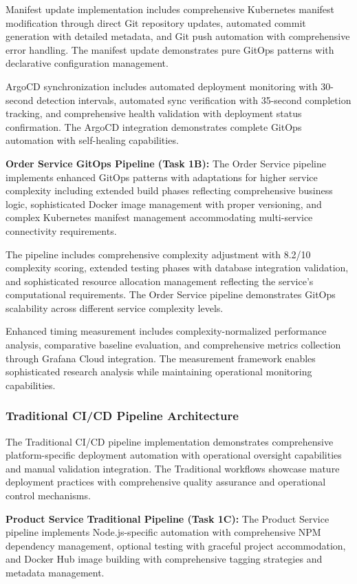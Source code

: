 Manifest update implementation includes comprehensive Kubernetes manifest modification through direct Git repository updates, automated commit generation with detailed metadata, and Git push automation with comprehensive error handling. The manifest update demonstrates pure GitOps patterns with declarative configuration management.

ArgoCD synchronization includes automated deployment monitoring with 30-second detection intervals, automated sync verification with 35-second completion tracking, and comprehensive health validation with deployment status confirmation. The ArgoCD integration demonstrates complete GitOps automation with self-healing capabilities.

\textbf{Order Service GitOps Pipeline (Task 1B):}
The Order Service pipeline implements enhanced GitOps patterns with adaptations for higher service complexity including extended build phases reflecting comprehensive business logic, sophisticated Docker image management with proper versioning, and complex Kubernetes manifest management accommodating multi-service connectivity requirements.

The pipeline includes comprehensive complexity adjustment with 8.2/10 complexity scoring, extended testing phases with database integration validation, and sophisticated resource allocation management reflecting the service's computational requirements. The Order Service pipeline demonstrates GitOps scalability across different service complexity levels.

Enhanced timing measurement includes complexity-normalized performance analysis, comparative baseline evaluation, and comprehensive metrics collection through Grafana Cloud integration. The measurement framework enables sophisticated research analysis while maintaining operational monitoring capabilities.

\subsubsection{Traditional CI/CD Pipeline Architecture}

The Traditional CI/CD pipeline implementation demonstrates comprehensive platform-specific deployment automation with operational oversight capabilities and manual validation integration. The Traditional workflows showcase mature deployment practices with comprehensive quality assurance and operational control mechanisms.

\textbf{Product Service Traditional Pipeline (Task 1C):}
The Product Service pipeline implements Node.js-specific automation with comprehensive NPM dependency management, optional testing with graceful project accommodation, and Docker Hub image building with comprehensive tagging strategies and metadata management.


